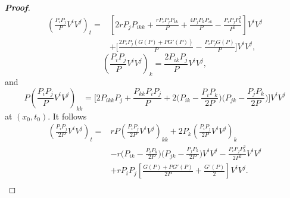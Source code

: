 \documentclass[10pt]{article}         %
\numberwithin{equation}{section}
\begin{document}
\begin{proof}[\bf Proof]
\begin{equation*}
\begin{aligned}
(\frac{P_iP_j}{P}V^iV^j)_t=&[2rP_jP_{ikk}+\frac{rP_iP_jP_{kk}}{P}+\frac{4P_jP_kP_{ik}}{P}-\frac{P_iP_jP_k^2}{P^2}]V^iV^j\\
&+\big[\frac{2P_iP_j(G(P)+PG'(P))}{P}-\frac{P_iP_jG(P)}{P}\big]V^iV^j,
\end{aligned}
\end{equation*}
\begin{equation*}
(\frac{P_iP_j}{P}V^iV^j)_k=\frac{2P_{ik}P_j}{P}V^iV^j,
\end{equation*}
and 
\begin{equation*}\label{pipjp}
    P(\frac{P_iP_j}{P}V^iV^j)_{kk}=\big[2P_{ikk}P_j+\frac{P_{kk}P_iP_j}{P}+2\big(P_{ik}-\frac{P_iP_k}{2P}\big)\big(P_{jk}-\frac{P_jP_k}{2P}\big)\big]V^iV^j
\end{equation*} 
at $(x_0,t_0)$.
It follows
\begin{equation}\label{k2}
\begin{aligned}
    (\frac{P_iP_j}{2P}V^iV^j)_t=&rP(\frac{P_iP_j}{2P}V^iV^j)_{kk}+2P_k(\frac{P_iP_j}{2P}V^iV^j)_k\\
    &-r\big(P_{ik}-\frac{P_iP_k}{2P}\big)\big(P_{jk}-\frac{P_jP_k}{2P}\big)V^iV^j-\frac{P_iP_jP_k^2}{2P^2}V^iV^j\\
    &+rP_iP_j[\frac{G(P)+PG'(P)}{2P}+\frac{G'(P)}{2}]V^iV^j.\\
\end{aligned}
\end{equation}


\end{proof}
\end{document}
